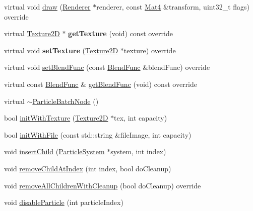 \begin{DoxyCompactItemize}
\item 
virtual void \hyperlink{classParticleBatchNode_a05ece10bbbbb5566e28ba1365498eb91}{draw} (\hyperlink{classRenderer}{Renderer} $\ast$renderer, const \hyperlink{classMat4}{Mat4} \&transform, uint32\+\_\+t flags) override
\item 
\mbox{\label{classParticleBatchNode_a0354a49ef37cb9fc337e42cf7599f7be}} 
virtual \hyperlink{classTexture2D}{Texture2D} $\ast$ {\bfseries get\+Texture} (void) const override
\item 
\mbox{\label{classParticleBatchNode_a1f8e0ba5cf0912610720987c94735ebd}} 
virtual void {\bfseries set\+Texture} (\hyperlink{classTexture2D}{Texture2D} $\ast$texture) override
\item 
virtual void \hyperlink{classParticleBatchNode_a00b968ce81dedae01d543bf3772cd91a}{set\+Blend\+Func} (const \hyperlink{structBlendFunc}{Blend\+Func} \&blend\+Func) override
\item 
virtual const \hyperlink{structBlendFunc}{Blend\+Func} \& \hyperlink{classParticleBatchNode_ad7768f402443d89151c31c8e1f3d1dbe}{get\+Blend\+Func} (void) const override
\item 
virtual \hyperlink{classParticleBatchNode_a81f606154458d85a20bef213e1d825ff}{$\sim$\+Particle\+Batch\+Node} ()
\item 
bool \hyperlink{classParticleBatchNode_a91c7160da6c6599fc1d150de43296cdc}{init\+With\+Texture} (\hyperlink{classTexture2D}{Texture2D} $\ast$tex, int capacity)
\item 
bool \hyperlink{classParticleBatchNode_a8d828f06462482ccfa1210502572a2c7}{init\+With\+File} (const std\+::string \&file\+Image, int capacity)
\item 
void \hyperlink{classParticleBatchNode_a1d1efda71101dc032ffee3e24ee1a61e}{insert\+Child} (\hyperlink{classParticleSystem}{Particle\+System} $\ast$system, int index)
\item 
void \hyperlink{classParticleBatchNode_a7f46acad56bfa65d5903121072f22a1a}{remove\+Child\+At\+Index} (int index, bool do\+Cleanup)
\item 
void \hyperlink{classParticleBatchNode_ac4875ff56dadd5f836d9b99a36201bb1}{remove\+All\+Children\+With\+Cleanup} (bool do\+Cleanup) override
\item 
void \hyperlink{classParticleBatchNode_a8041807df39f5cdfa35b5423bb5c4a17}{disable\+Particle} (int particle\+Index)
\item 

\end{DoxyCompactItemize}
